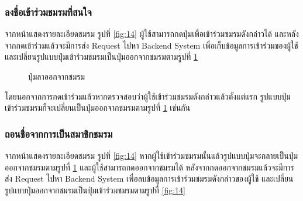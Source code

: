 \documentclass[14pt,oneside,openright,a4paper]{cpe-thai-project}
\begin{document}
\subsubsection{ลงชื่อเข้าร่วมชมรมที่สนใจ}
จากหน้าแสดงรายละเอียดชมรม รูปที่ \ref{fig:14} ผู้ใช้สามารถกดปุ่มเพื่อเข้าร่วมชมรมดังกล่าวได้ และหลังจากกดเข้าร่วมแล้วจะมีการส่ง Request ไปหา Backend System เพื่อเก็บข้อมูลการเข้าร่วมของผู้ใช้และเปลี่ยนรูปแบบปุ่มเข้าร่วมชมรมเป็นปุ่มออกจากชมรมตามรูปที่ \ref{fig:17}
\begin{figure}[H]\centering
  \setlength{\fboxrule}{0.5mm}
  \setlength{\fboxsep}{0.5cm}
  \caption{ปุ่มลาออกจากชมรม}\label{fig:17}
\end{figure}
โดยนอกจากการกดเข้าร่วมแล้วหากตรวจสอบว่าผู้ใช้เข้าร่วมชมรมดังกล่าวแล้วตั้งแต่แรก รูปแบบปุ่มเข้าร่วมชมรมก็จะเปลี่ยนเป็นปุ่มออกจากชมรมตามรูปที่ \ref{fig:17} เช่นกัน

\subsubsection{ถอนชื่อจากการเป็นสมาชิกชมรม}
จากหน้าแสดงรายละเอียดชมรม รูปที่ \ref{fig:14} หากผู้ใช้เข้าร่วมชมรมนั้นแล้วรูปแบบปุ่มจะกลายเป็นปุ่มออกจากชมรมตามรูปที่ \ref{fig:17} และผู้ใช้สามารถกดออกจากชมรมได้ หลังจากกดออกจากชมรมแล้วจะมีการส่ง Request ไปหา Backend System เพื่อลบข้อมูลการเข้าร่วมชมรมดังกล่าวของผู้ใช้ และเปลี่ยนรูปแบบปุ่มออกจากชมรมเป็นปุ่มเข้าร่วมชมรมตามรูปที่ \ref{fig:14}
\end{document}
